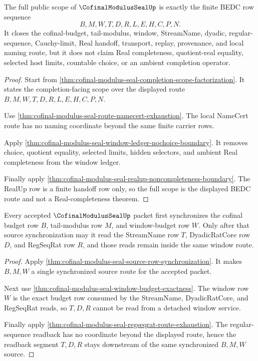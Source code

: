 \begin{theorem}
\label{thm:cofinal-modulus-seal-finite-route-scope}
The full public scope of $\CofinalModulusSealUp$ is exactly the finite BEDC row sequence
$$
B,M,W,T,D,R,L,E,H,C,P,N.
$$
It closes the cofinal-budget, tail-modulus, window, StreamName, dyadic, regular-sequence, Cauchy-limit, Real handoff, transport, replay, provenance, and local naming route, but it does not claim Real completeness, quotient-real equality, selected host limits, countable choice, or an ambient completion operator.
\end{theorem}
\begin{proof}
Start from \autoref{thm:cofinal-modulus-seal-completion-scope-factorization}. It states the completion-facing scope over the displayed route $B,M,W,T,D,R,L,E,H,C,P,N$.

Use \autoref{thm:cofinal-modulus-seal-route-namecert-exhaustion}. The local NameCert route has no naming coordinate beyond the same finite carrier rows.

Apply \autoref{thm:cofinal-modulus-seal-window-ledger-nochoice-boundary}. It removes choice, quotient equality, selected limits, hidden selectors, and ambient Real completeness from the window ledger.

Finally apply \autoref{thm:cofinal-modulus-seal-realup-noncompleteness-boundary}. The RealUp row is a finite handoff row only, so the full scope is the displayed BEDC route and not a Real-completeness theorem.
\end{proof}

\begin{theorem}
\label{thm:cofinal-modulus-seal-budget-window-regularity-chain}
Every accepted $\CofinalModulusSealUp$ packet first synchronizes the cofinal budget row $B$, tail-modulus row $M$, and window-budget row $W$. Only after that source synchronization may it read the StreamName row $T$, DyadicRatCore row $D$, and RegSeqRat row $R$, and those reads remain inside the same window route.
\end{theorem}
\begin{proof}
Apply \autoref{thm:cofinal-modulus-seal-source-row-synchronization}. It makes $B,M,W$ a single synchronized source route for the accepted packet.

Next use \autoref{thm:cofinal-modulus-seal-window-budget-exactness}. The window row $W$ is the exact budget row consumed by the StreamName, DyadicRatCore, and RegSeqRat reads, so $T,D,R$ cannot be read from a detached window service.

Finally apply \autoref{thm:cofinal-modulus-seal-regseqrat-route-exhaustion}. The regular-sequence readback has no coordinate beyond the displayed route, hence the readback segment $T,D,R$ stays downstream of the same synchronized $B,M,W$ source.
\end{proof}

